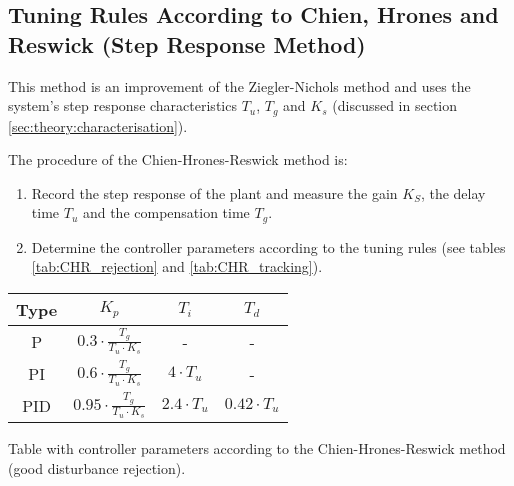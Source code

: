 \subsection{Tuning Rules According to Chien, Hrones and Reswick (Step Response Method)}

This  method is an improvement of the  Ziegler-Nichols  method  and  uses  the
system's step response characteristics $T_u$, $T_g$ and  $K_s$  (discussed  in
section \ref{sec:theory:characterisation}).

The procedure of the Chien-Hrones-Reswick method is:

\begin{enumerate}
    \item Record the step response of the plant and measure the gain $K_{S}$, the delay time $T_{u}$ and the compensation time $T_{g}$.
    \item Determine the controller parameters according to the tuning rules (see tables \ref{tab:CHR_rejection} and \ref{tab:CHR_tracking}).
\end{enumerate}

\begin{center}
    \begin{threeparttable}
        \begin{tabular}{cccc}
            \toprule
            Type & $K_p$                                    &  $T_{i}$            &  $T_{d}$ \\
            \midrule
            P    &  $0.3   \cdot\frac{T_g}{T_u \cdot K_s}$  &  -                  &  -                  \\
            PI   &  $0.6   \cdot\frac{T_g}{T_u \cdot K_s}$  &  $4 \cdot T_u$      &  -                  \\
            PID  &  $0.95  \cdot\frac{T_g}{T_u \cdot K_s}$  &  $2.4 \cdot T_u$    &  $0.42 \cdot T_u$   \\
            \bottomrule
        \end{tabular}
        \caption{Table with controller parameters according to the Chien-Hrones-Reswick method (good disturbance rejection).}
        \label{tab:CHR_rejection}
    \end{threeparttable}
\end{center}

